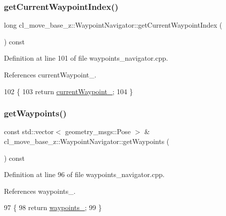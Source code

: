 \subsubsection{\texorpdfstring{get\+Current\+Waypoint\+Index()}{getCurrentWaypointIndex()}}
{\footnotesize\ttfamily long cl\+\_\+move\+\_\+base\+\_\+z\+::\+Waypoint\+Navigator\+::get\+Current\+Waypoint\+Index (\begin{DoxyParamCaption}{ }\end{DoxyParamCaption}) const}



Definition at line 101 of file waypoints\+\_\+navigator.\+cpp.



References current\+Waypoint\+\_\+.


\begin{DoxyCode}
102 \{
103   \textcolor{keywordflow}{return} \hyperlink{classcl__move__base__z_1_1WaypointNavigator_a82859e418592c2392c20a2d11b9836eb}{currentWaypoint\_};
104 \}
\end{DoxyCode}
\mbox{\label{classcl__move__base__z_1_1WaypointNavigator_a553cdd4ddc20ff26c1bdcb6dad42911f}} 
\subsubsection{\texorpdfstring{get\+Waypoints()}{getWaypoints()}}
{\footnotesize\ttfamily const std\+::vector$<$ geometry\+\_\+msgs\+::\+Pose $>$ \& cl\+\_\+move\+\_\+base\+\_\+z\+::\+Waypoint\+Navigator\+::get\+Waypoints (\begin{DoxyParamCaption}{ }\end{DoxyParamCaption}) const}



Definition at line 96 of file waypoints\+\_\+navigator.\+cpp.



References waypoints\+\_\+.


\begin{DoxyCode}
97 \{
98   \textcolor{keywordflow}{return} \hyperlink{classcl__move__base__z_1_1WaypointNavigator_a727f6a73e15ff5dc6bb3ffdf52c3d832}{waypoints\_};
99 \}
\end{DoxyCode}
\mbox{\label{classcl__move__base__z_1_1WaypointNavigator_a5d40e7942620c3c191e2a3bd75845069}} 
